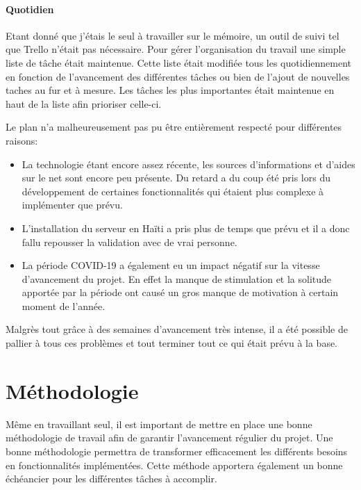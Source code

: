 \documentclass{EPL-master-thesis-covers-FR}
\begin{document}
				\paragraph*{Quotidien}
				Etant donné que j'étais le seul à travailler sur le mémoire, un outil de suivi tel que Trello n'était pas nécessaire. Pour gérer l'organisation du travail une simple liste de tâche était maintenue. Cette liste était modifiée tous les quotidiennement en fonction de l'avancement des différentes tâches ou bien de l'ajout de nouvelles taches au fur et à mesure. Les tâches les plus importantes était maintenue en haut de la liste afin prioriser celle-ci. 
				
				Le plan n'a malheureusement pas pu être entièrement respecté pour différentes raisons:
				\begin{itemize}
					\item La technologie étant encore assez récente, les sources d'informations et d'aides sur le net sont encore peu présente. Du retard a du coup été pris lors du développement de certaines fonctionnalités qui étaient plus complexe à implémenter que prévu.
					\item L'installation du serveur en Haïti a pris plus de temps que prévu et il a donc fallu repousser la validation avec de vrai personne. 
					\item La période COVID-19 a également eu un impact négatif sur la vitesse d'avancement du projet. En effet la manque de stimulation et la solitude apportée par la période ont causé un gros manque de motivation à certain moment de l'année.
				\end{itemize}				
				
				Malgrès tout grâce à des semaines d'avancement très intense, il a été possible de pallier à tous ces problèmes et tout terminer tout ce qui était prévu à la base.
				

		\section{Méthodologie}
			Même en travaillant seul, il est important de mettre en place une bonne méthodologie de travail afin de garantir l'avancement régulier du projet. Une bonne méthodologie permettra de transformer efficacement les différents besoins en fonctionnalités implémentées. Cette méthode apportera également un bonne échéancier pour les différentes tâches à accomplir.
\end{document}
